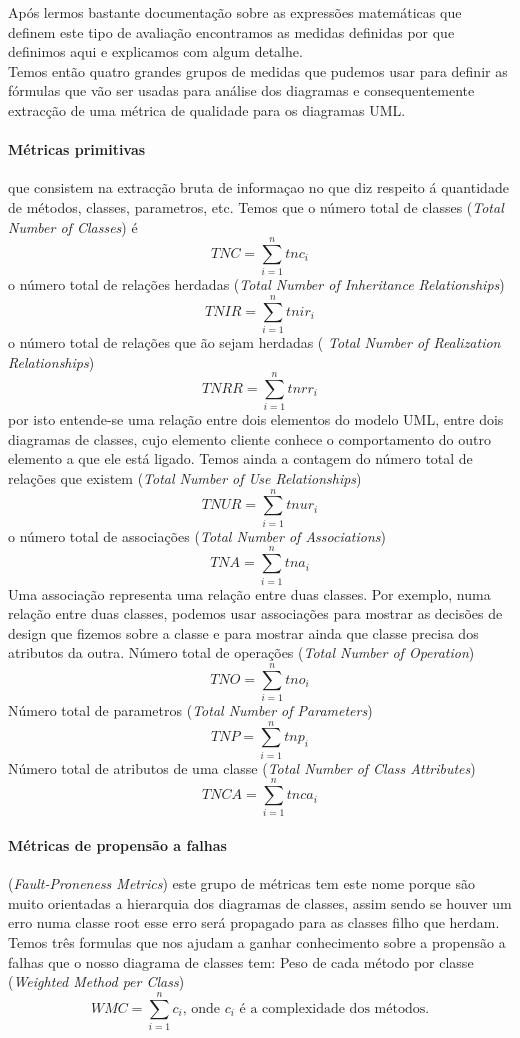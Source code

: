 Após lermos bastante documentação sobre as expressões matemáticas que definem este tipo de avaliação encontramos as medidas definidas por \cite{Peter}
que definimos aqui e explicamos com algum detalhe.\\

Temos então quatro grandes grupos de medidas que pudemos usar para definir as fórmulas que vão ser usadas para análise dos diagramas e
consequentemente extracção de uma métrica de qualidade para os diagramas UML.
\paragraph{Métricas primitivas} que consistem na extracção bruta de informaçao no que diz respeito á quantidade de métodos, classes, parametros, etc.
Temos que o número total de classes (\textit{Total Number of Classes}) é $$TNC = \sum_{i=1}^{n} tnc_i $$
o número total de relações herdadas (\textit{Total Number of Inheritance Relationships})  $$TNIR = \sum_{i=1}^{n} tnir_i $$
o número total de relações que ão sejam herdadas (\textit{ Total Number of Realization Relationships})  $$TNRR = \sum_{i=1}^{n} tnrr_i $$ por isto entende-se
uma relação entre dois elementos do modelo UML, entre dois diagramas de classes, cujo elemento cliente conhece o comportamento do outro elemento a que ele está ligado.
Temos ainda a contagem do número total de relações que existem (\textit{Total Number of Use Relationships})  $$TNUR = \sum_{i=1}^{n} tnur_i $$
o número total de associações (\textit{Total Number of Associations})    $$TNA = \sum_{i=1}^{n} tna_i $$
Uma associação representa uma relação entre duas classes. Por exemplo, numa relação entre duas classes, podemos usar associações para mostrar as decisões de design
que fizemos sobre a classe e para mostrar ainda que classe precisa dos atributos da outra.
Número total de operações (\textit{Total Number of Operation})   $$TNO = \sum_{i=1}^{n} tno_i $$
Número total de parametros (\textit{Total Number of Parameters})  $$TNP = \sum_{i=1}^{n} tnp_i $$
Número total de atributos de uma classe (\textit{Total Number of Class Attributes})  $$TNCA = \sum_{i=1}^{n} tnca_i $$

\paragraph{Métricas de propensão a falhas} (\textit{Fault-Proneness Metrics}) este grupo de métricas tem este nome porque são muito orientadas a hierarquia dos diagramas
de classes, assim sendo se houver um erro numa classe root esse erro será propagado para as classes filho que herdam.
Temos três formulas que nos ajudam a ganhar conhecimento sobre a propensão a falhas que o nosso diagrama de classes tem:
Peso de cada método por classe (\textit{Weighted Method per Class}) 
\begin{displaymath}
WMC = \sum_{i=1}^{n} c_i  \textrm{, onde $c_i$ é a complexidade dos métodos.}
\end{displaymath}


